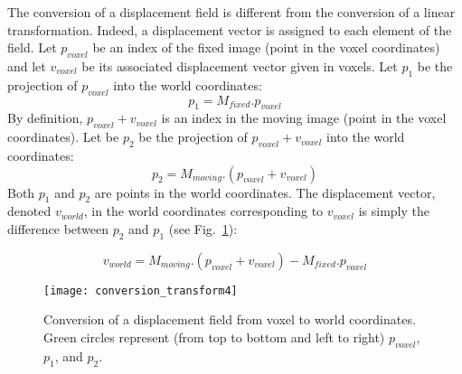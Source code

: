 The conversion of a displacement field is different from the conversion of a linear transformation. Indeed, a displacement vector is assigned to each element of the field. Let $p_{voxel}$ be an index of the fixed image (point in the voxel coordinates) and let $v_{voxel}$ be its associated displacement vector given in voxels. Let $p_1$ be the projection of $p_{voxel}$ into the world coordinates:
%
\begin{equation}
p_1 = M_{fixed} . p_{voxel}
\end{equation}
%
By definition, $p_{voxel} + v_{voxel}$ is an index in the moving image (point in the voxel coordinates). Let be $p_2$ be the projection of $p_{voxel} + v_{voxel}$ into the world coordinates:
%
\begin{equation}
p_2 = M_{moving} . \left( p_{voxel} + v_{voxel} \right)
\end{equation}
%
Both $p_1$ and $p_2$ are points in the world coordinates. The displacement vector, denoted $v_{world}$, in the world coordinates corresponding to $v_{voxel}$ is simply the difference between $p_2$ and $p_1$ (see Fig.~\ref{fig:tools:conv:4}):

%
\begin{equation}
v_{world} = M_{moving} . \left( p_{voxel} + v_{voxel} \right) - M_{fixed} . p_{voxel}
\end{equation}
%

\begin{figure}[!htbp]
\centering
\texttt{[image: conversion\_transform4]}
\caption{Conversion of a displacement field from voxel to world coordinates. Green circles represent (from top to bottom and left to right) $p_{voxel}$, $p_1$, and $p_2$.}
\label{fig:tools:conv:4}
\end{figure}